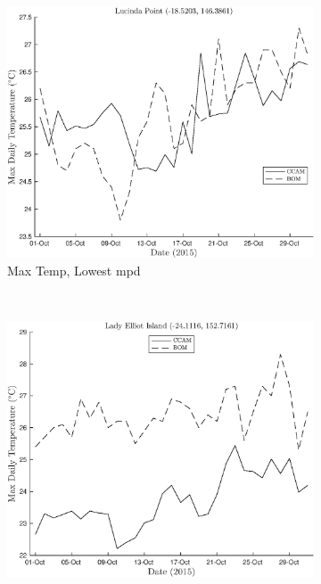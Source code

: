 \begin{figure}[!hbt]
    \centering
    \begin{subfigure}[b]{0.45\textwidth}
    	\includegraphics[width=\textwidth]{Fig/Research/BomComparison/MaxTemp_vs_Time_Lucinda_Point.eps}
	    \caption{Max Temp, Lowest \gls{mpd}}
	    \label{subfig:maxtlucpoint}
    \end{subfigure}
    ~~~
    \begin{subfigure}[b]{0.45\textwidth}
    	\includegraphics[width=\textwidth]{Fig/Research/BomComparison/MaxTemp_vs_Time_Lady_Elliot_Island.eps}

\end{subfigure}
\end{figure}
